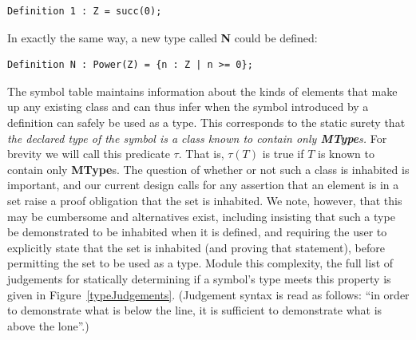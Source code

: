 \begin{lstlisting}
Definition 1 : Z = succ(0);
\end{lstlisting}

In exactly the same way, a new type called \textbf{N} could be defined:

\begin{lstlisting}
Definition N : Power(Z) = {n : Z | n >= 0};
\end{lstlisting}

The symbol table maintains information about the kinds of elements that make up any existing class and can thus infer when the symbol introduced by a definition can safely be used as a type.  This corresponds to the static surety that \emph{the declared type of the symbol is a class known to contain only \textbf{MType}s.}  For brevity we will call this predicate $\tau$.  That is, $\tau(T)$ is true if $T$ is known to contain only \textbf{MType}s.  The question of whether or not such a class is inhabited is important, and our current design calls for any assertion that an element is in a set raise a proof obligation that the set is inhabited.  We note, however, that this may be cumbersome and alternatives exist, including insisting that such a type be demonstrated to be inhabited when it is defined, and requiring the user to explicitly state that the set is inhabited (and proving that statement), before permitting the set to be used as a type.  Module this complexity, the full list of judgements for statically determining if a symbol's type meets this property is given in Figure~\ref{typeJudgements}. (Judgement syntax is read as follows: ``in order to demonstrate what is below the line, it is sufficient to demonstrate what is above the lone''.)

